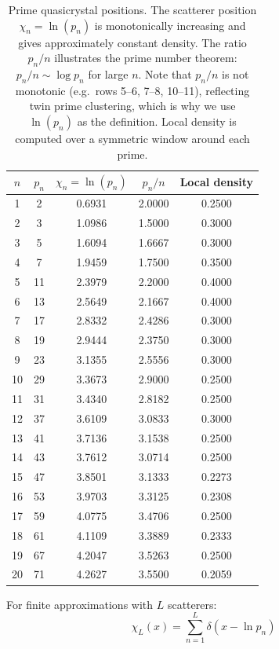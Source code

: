 \documentclass[11pt, oneside]{article}
\theoremstyle{definition}
\begin{document}
\begin{table}[htbp]
\centering
\begin{tabular}{|c|c|c|c|c|}
\hline
$n$ & $p_n$ & $\chi_n = \ln(p_n)$ & $p_n/n$ & Local density \\
\hline
  1 &  2 & 0.6931 & 2.0000 & 0.2500 \\
  2 &  3 & 1.0986 & 1.5000 & 0.3000 \\
  3 &  5 & 1.6094 & 1.6667 & 0.3000 \\
  4 &  7 & 1.9459 & 1.7500 & 0.3500 \\
  5 & 11 & 2.3979 & 2.2000 & 0.4000 \\
  6 & 13 & 2.5649 & 2.1667 & 0.4000 \\
  7 & 17 & 2.8332 & 2.4286 & 0.3000 \\
  8 & 19 & 2.9444 & 2.3750 & 0.3000 \\
  9 & 23 & 3.1355 & 2.5556 & 0.3000 \\
 10 & 29 & 3.3673 & 2.9000 & 0.2500 \\
 11 & 31 & 3.4340 & 2.8182 & 0.2500 \\
 12 & 37 & 3.6109 & 3.0833 & 0.3000 \\
 13 & 41 & 3.7136 & 3.1538 & 0.2500 \\
 14 & 43 & 3.7612 & 3.0714 & 0.2500 \\
 15 & 47 & 3.8501 & 3.1333 & 0.2273 \\
 16 & 53 & 3.9703 & 3.3125 & 0.2308 \\
 17 & 59 & 4.0775 & 3.4706 & 0.2500 \\
 18 & 61 & 4.1109 & 3.3889 & 0.2333 \\
 19 & 67 & 4.2047 & 3.5263 & 0.2500 \\
 20 & 71 & 4.2627 & 3.5500 & 0.2059 \\
\hline
\end{tabular}
\caption{Prime quasicrystal positions. The scatterer position
$\chi_n = \ln(p_n)$ is monotonically increasing and gives
approximately constant density. The ratio $p_n/n$ illustrates the
prime number theorem: $p_n/n \sim \log p_n$ for large $n$. Note
that $p_n/n$ is not monotonic (e.g.\ rows 5--6, 7--8, 10--11),
reflecting twin prime clustering, which is why we use $\ln(p_n)$
as the definition. Local density is computed over a symmetric
window around each prime.}
\label{tab:positions}
\end{table}

For finite approximations with $L$ scatterers:
\begin{equation}
\chi_L(x) = \sum_{n=1}^{L} \delta\!\left(x - \ln p_n\right)
\end{equation}
\end{document}
